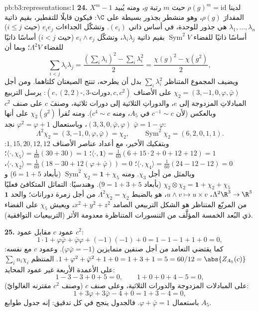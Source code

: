 \begin{solution}{pb:b3:representations:1}
\textbf{24.} لدينا $\rho(g)^m = \mathrm{id}$ حيث $m$ رتبة $g$، ومنه يُبيد
$X^m - 1$ المقدارَ $\rho(g)$، وهو منشطر بجذور بسيطة على $\C$:
فيكون قابلًا للتقطير، بقيم ذاتية $\lambda_1, \dots, \lambda_n$ هي جذور للوحدة، في
أساس ذاتي $(e_i)$. وتشكّل الجداءات $e_ie_j$ (حيث $i \leq j$)
أساسًا ذاتيًا للفضاء $\operatorname{Sym}^2V$ بقيم ذاتية $\lambda_i\lambda_j$، وتشكّل
$e_i \wedge e_j$ (حيث $i < j$) أساسًا ذاتيًا للفضاء
$\Lambda^2V$؛ وبما أن
\[
\sum_{i<j}\lambda_i\lambda_j
= \frac{(\sum_i\lambda_i)^2 - \sum_i\lambda_i^2}2
= \frac{\chi(g)^2 - \chi(g^2)}2,
\]
ويضيف المجموع المتناظر $\sum_i\lambda_i^2$ بدل أن يطرحه، تنتج الصيغتان
كلتاهما. ومن أجل $\chi_2 = (3, -1,
0, \varphi, \bar\varphi)$ على الأصناف $(e, (2,2)\text{-},
3\text{-دورات}, c, c^2)$: يرسل التربيع
المبادلاتِ المزدوجة إلى $e$، والدوراتِ الثلاثية إلى دورات
ثلاثية، وصنفَ $c$ على صنف $c^2$ وبالعكس (لأن $c^{-1} \sim
c$ في $A_5$،
ومنه $c^4 \sim c$). ومنه تُقرأ $\chi_2(g^2)$ على أنها $(3,
3, 0, \bar\varphi, \varphi)$،
وباستعمال $\varphi^2 = \varphi
+ 1$ نجد $\bar\varphi = 1 - \varphi$:
\[
\Lambda^2\chi_2 = (3, -1, 0, \varphi, \bar\varphi) = \chi_2,
\qquad
\operatorname{Sym}^2\chi_2 = (6, 2, 0, 1, 1) .
\]
وبتفكيك الأخير، مع أعداد عناصر الأصناف $1, 15, 20, 12,
12$: $\langle\cdot, \mathbf 1\rangle = \frac1{60}(6 +
15\cdot2 + 0 + 12 + 12) = 1$؛
$\langle\cdot, \chi_5\rangle =
\frac1{60}(30 + 30) = 1$؛ $\langle\cdot, \chi_4\rangle =
\frac1{60}(24 - 12 - 12) = 0$؛ $\langle\cdot, \chi_2\rangle =
\frac1{60}(18 - 30 + 12(\varphi + \bar\varphi)) = 0$، وبالمثل من أجل $\chi_3$. ومنه
$\operatorname{Sym}^2\chi_2 =
\mathbf 1 + \chi_5$ (بأبعاد $6 = 1 + 5$) و
$\chi_2\otimes\chi_2 = \mathbf 1 + \chi_2 + \chi_5$
(بأبعاد $9 = 1 + 3 + 5$). وهندسيًا: التماثل المتكافئ فعليًا
$\Lambda^2\R^3 \to \R^3$، $u \wedge v \mapsto u
\times v$، هو بالضبط $\Lambda^2\chi_2 = \chi_2$ من أجل زمرة دورانات؛ والحد
$\mathbf 1$ من المربّع المتناظر هو الشكل التربيعي الصامد
$x^2 + y^2 + z^2$، ويعيش $\chi_5$ على الفضاء ذي البُعد الخمسة المؤلَّف من
التنسورات المتناظرة معدومة الأثر (التربيعيات التوافقية).

\textbf{25.} عمود $c$ مقابل عمود $c^2$:
\[
1\cdot1 + \varphi\bar\varphi + \bar\varphi\varphi +
(-1)(-1) + 0 = 1 - 1 - 1 + 1 + 0 = 0,
\]
كما يقتضي التعامد من أجل صنفين متمايزين ($\varphi
\bar\varphi = -1$). وعمود $c$
مع نفسه: $1 +
\varphi^2 + \bar\varphi^2 + 1 + 0 = 1 + 3 + 1 = 5 = 60/12 =
\abs{Z_{A_5}(c)}$.  المنتظم $\sum_in_i\chi_i$ على الأعمدة الأربعة
غير عمود المحايد:
\[
1 - 3 - 3 + 0 + 5 = 0, \qquad
1 + 0 + 0 + 4 - 5 = 0,
\]
على المبادلات المزدوجة والدورات الثلاثية، وعلى صنف $c$ (وصنف
$c^2$ مقترنه الغالوايّ):
\[
1 + 3\varphi + 3\bar\varphi - 4 + 0 = 1 + 3 - 4 = 0,
\]
باستعمال $\varphi + \bar\varphi = 1$. فالجدول ينجح في كل تدقيق: إنه جدول طوابع
$A_5$.
\end{solution}
